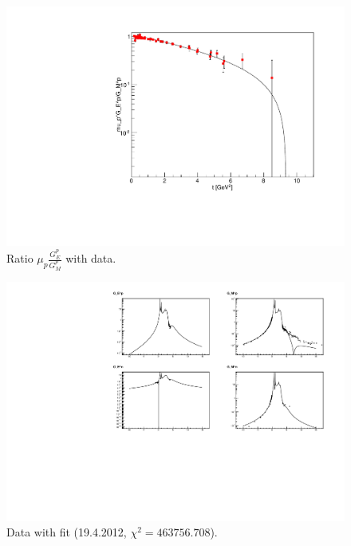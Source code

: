 \documentclass[a4paper,12pt,final]{article}
\begin{document}
\begin{figure}[h!]
\begin{center}
\includegraphics[angle=0,scale=0.45]{Ratio-ModD}
\end{center}
\caption{Ratio $\mu_p\frac{G_E^p}{G_M^p}$ with data.}
\end{figure}

\newpage

\begin{figure}[h!]
\begin{center}
\includegraphics[angle=90,scale=0.95]{Fit1}
\end{center}
\caption{Data with fit (19.4.2012, $\chi^2=463756.708$).}
\end{figure}
\end{document}
